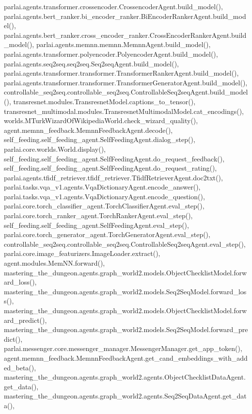 parlai.\+agents.\+transformer.\+crossencoder.\+Crossencoder\+Agent.\+build\+\_\+model(), parlai.\+agents.\+bert\+\_\+ranker.\+bi\+\_\+encoder\+\_\+ranker.\+Bi\+Encoder\+Ranker\+Agent.\+build\+\_\+model(), parlai.\+agents.\+bert\+\_\+ranker.\+cross\+\_\+encoder\+\_\+ranker.\+Cross\+Encoder\+Ranker\+Agent.\+build\+\_\+model(), parlai.\+agents.\+memnn.\+memnn.\+Memnn\+Agent.\+build\+\_\+model(), parlai.\+agents.\+transformer.\+polyencoder.\+Polyencoder\+Agent.\+build\+\_\+model(), parlai.\+agents.\+seq2seq.\+seq2seq.\+Seq2seq\+Agent.\+build\+\_\+model(), parlai.\+agents.\+transformer.\+transformer.\+Transformer\+Ranker\+Agent.\+build\+\_\+model(), parlai.\+agents.\+transformer.\+transformer.\+Transformer\+Generator\+Agent.\+build\+\_\+model(), controllable\+\_\+seq2seq.\+controllable\+\_\+seq2seq.\+Controllable\+Seq2seq\+Agent.\+build\+\_\+model(), transresnet.\+modules.\+Transresnet\+Model.\+captions\+\_\+to\+\_\+tensor(), transresnet\+\_\+multimodal.\+modules.\+Transresnet\+Multimodal\+Model.\+cat\+\_\+encodings(), worlds.\+M\+Turk\+Wizard\+Of\+Wikipedia\+World.\+check\+\_\+wizard\+\_\+quality(), agent.\+memnn\+\_\+feedback.\+Memnn\+Feedback\+Agent.\+decode(), self\+\_\+feeding.\+self\+\_\+feeding\+\_\+agent.\+Self\+Feeding\+Agent.\+dialog\+\_\+step(), parlai.\+core.\+worlds.\+World.\+display(), self\+\_\+feeding.\+self\+\_\+feeding\+\_\+agent.\+Self\+Feeding\+Agent.\+do\+\_\+request\+\_\+feedback(), self\+\_\+feeding.\+self\+\_\+feeding\+\_\+agent.\+Self\+Feeding\+Agent.\+do\+\_\+request\+\_\+rating(), parlai.\+agents.\+tfidf\+\_\+retriever.\+tfidf\+\_\+retriever.\+Tfidf\+Retriever\+Agent.\+doc2txt(), parlai.\+tasks.\+vqa\+\_\+v1.\+agents.\+Vqa\+Dictionary\+Agent.\+encode\+\_\+answer(), parlai.\+tasks.\+vqa\+\_\+v1.\+agents.\+Vqa\+Dictionary\+Agent.\+encode\+\_\+question(), parlai.\+core.\+torch\+\_\+classifier\+\_\+agent.\+Torch\+Classifier\+Agent.\+eval\+\_\+step(), parlai.\+core.\+torch\+\_\+ranker\+\_\+agent.\+Torch\+Ranker\+Agent.\+eval\+\_\+step(), self\+\_\+feeding.\+self\+\_\+feeding\+\_\+agent.\+Self\+Feeding\+Agent.\+eval\+\_\+step(), parlai.\+core.\+torch\+\_\+generator\+\_\+agent.\+Torch\+Generator\+Agent.\+eval\+\_\+step(), controllable\+\_\+seq2seq.\+controllable\+\_\+seq2seq.\+Controllable\+Seq2seq\+Agent.\+eval\+\_\+step(), parlai.\+core.\+image\+\_\+featurizers.\+Image\+Loader.\+extract(), agent.\+modules.\+Mem\+N\+N.\+forward(), mastering\+\_\+the\+\_\+dungeon.\+agents.\+graph\+\_\+world2.\+models.\+Object\+Checklist\+Model.\+forward\+\_\+loss(), mastering\+\_\+the\+\_\+dungeon.\+agents.\+graph\+\_\+world2.\+models.\+Seq2\+Seq\+Model.\+forward\+\_\+loss(), mastering\+\_\+the\+\_\+dungeon.\+agents.\+graph\+\_\+world2.\+models.\+Object\+Checklist\+Model.\+forward\+\_\+predict(), mastering\+\_\+the\+\_\+dungeon.\+agents.\+graph\+\_\+world2.\+models.\+Seq2\+Seq\+Model.\+forward\+\_\+predict(), parlai.\+messenger.\+core.\+messenger\+\_\+manager.\+Messenger\+Manager.\+get\+\_\+app\+\_\+token(), agent.\+memnn\+\_\+feedback.\+Memnn\+Feedback\+Agent.\+get\+\_\+cand\+\_\+embeddings\+\_\+with\+\_\+added\+\_\+beta(), mastering\+\_\+the\+\_\+dungeon.\+agents.\+graph\+\_\+world2.\+agents.\+Object\+Checklist\+Data\+Agent.\+get\+\_\+data(), mastering\+\_\+the\+\_\+dungeon.\+agents.\+graph\+\_\+world2.\+agents.\+Seq2\+Seq\+Data\+Agent.\+get\+\_\+data(), 